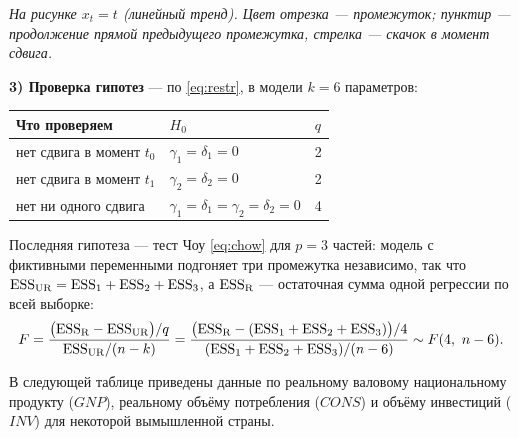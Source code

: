 \begin{solution}
\begin{center}

\smallskip
{\small\itshape На рисунке $x_t = t$ (линейный тренд). Цвет отрезка — промежуток;
пунктир — продолжение прямой предыдущего промежутка, стрелка — скачок в момент
сдвига.\par}
\end{center}

\medskip
\textbf{3) Проверка гипотез} — по \eqref{eq:restr}, в модели $k = 6$
параметров:
\begin{center}
\begin{tabular}{lll}
\toprule
Что проверяем & $H_0$ & $q$ \\
\midrule
нет сдвига в момент $t_0$ & $\gamma_1 = \delta_1 = 0$ & 2 \\
нет сдвига в момент $t_1$ & $\gamma_2 = \delta_2 = 0$ & 2 \\
нет ни одного сдвига      & $\gamma_1 = \delta_1 = \gamma_2 = \delta_2 = 0$ & 4 \\
\bottomrule
\end{tabular}
\end{center}
Последняя гипотеза — тест Чоу \eqref{eq:chow} для $p = 3$ частей: модель с
фиктивными переменными подгоняет три промежутка независимо, так что
$\mathrm{ESS}_{\mathrm{UR}} = \mathrm{ESS}_1 + \mathrm{ESS}_2 + \mathrm{ESS}_3$, а $\mathrm{ESS}_{\mathrm{R}}$ —
остаточная сумма одной регрессии по всей выборке:
\[
  F = \frac{\bigl(\ESS_{\mathrm{R}} - \ESS_{\mathrm{UR}}\bigr)/q}
           {\ESS_{\mathrm{UR}}/(n-k)}
    = \frac{\bigl(\ESS_{\mathrm{R}} - (\ESS_1 + \ESS_2 + \ESS_3)\bigr)/4}
           {(\ESS_1 + \ESS_2 + \ESS_3)/(n - 6)} \sim F(4,\ n-6).
\]
\end{solution}

\ifsolutions\clearpage\fi
{}

В следующей таблице приведены данные по реальному валовому национальному
продукту ($\mathit{GNP}$), реальному объёму потребления ($\mathit{CONS}$) и
объёму инвестиций ($\mathit{INV}$) для некоторой вымышленной страны.

